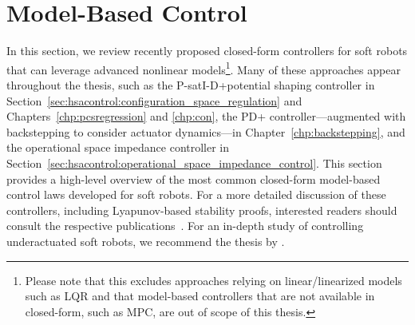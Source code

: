 \section{Model-Based Control}\label{sec:background:model_based_control}
In this section, we review recently proposed closed-form controllers for soft robots that can leverage advanced nonlinear models\footnote{Please note that this excludes approaches relying on linear/linearized models such as \gls{LQR} and that model-based controllers that are not available in closed-form, such as \gls{MPC}, are out of scope of this thesis.}. Many of these approaches appear throughout the thesis, such as the P-satI-D+potential shaping controller in Section~\ref{sec:hsacontrol:configuration_space_regulation} and Chapters~\ref{chp:pcsregression} and \ref{chp:con}, the PD+ controller—augmented with backstepping to consider actuator dynamics—in Chapter~\ref{chp:backstepping}, and the operational space impedance controller in Section~\ref{sec:hsacontrol:operational_space_impedance_control}. This section provides a high-level overview of the most common closed-form model-based control laws developed for soft robots. For a more detailed discussion of these controllers, including Lyapunov-based stability proofs, interested readers should consult the respective publications~\citep{della2020model, pustina2022feedback, pustina2022p, borja2022energy, della2023model}. For an in-depth study of controlling underactuated soft robots, we recommend the thesis by \citet{pustina2025analysis}.

